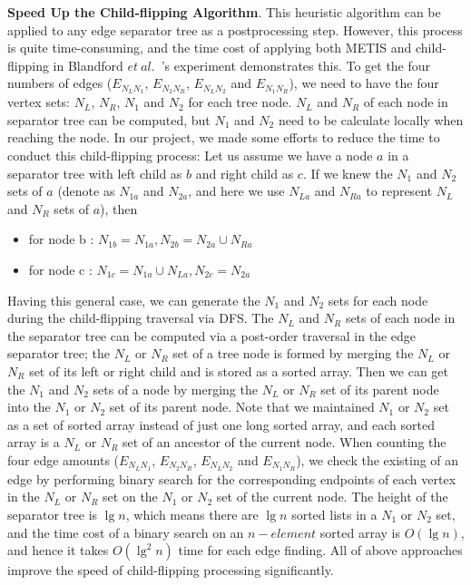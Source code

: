 \documentclass[12pt,glossary]{dalthesis}
\begin{document}
\bigskip
\bigskip

\textbf{Speed Up the Child-flipping Algorithm}. This heuristic algorithm can be applied to any edge separator tree as a postprocessing step. However, this process is quite time-consuming, and the time cost of applying both METIS and child-flipping in Blandford $et \ al.$~\cite{compact-representation}'s experiment demonstrates this. To get the four numbers of edges ($E_{N_{L}N_{1}}$, $E_{N_{2}N_{R}}$, $E_{N_{L}N_{2}}$ and $E_{N_{1}N_{R}}$), we need to have the four vertex sets: $N_{L}$, $N_{R}$, $N_{1}$ and $N_{2}$ for each tree node. $N_{L}$ and $N_{R}$ of each node in separator tree can be computed, but $N_{1}$ and $N_{2}$ need to be calculate locally when reaching the node. In our project, we made some efforts to reduce the time to conduct this child-flipping process: Let us assume we have a node $a$ in a separator tree with left child as $b$ and right child as $c$. If we knew the $N_{1}$ and $N_{2}$ sets of $a$ (denote as $N_{1a}$ and $N_{2a}$, and here we use $N_{La}$ and $N_{Ra}$ to represent $N_{L}$ and $N_{R}$ sets of $a$), then

\begin{itemize}[noitemsep]
\item for node b : $ N_{1b} = N_{1a}, N_{2b} = N_{2a} \cup N_{Ra}$
\item for node c : $ N_{1c} = N_{1a} \cup N_{La}, N_{2c} = N_{2a}$ 
\end{itemize}

Having this general case,  we can generate the $N_{1}$ and $N_{2}$ sets for each node during the child-flipping traversal via DFS. The $N_{L}$ and $N_{R}$ sets of each node in the separator tree can be computed via a post-order traversal in the edge separator tree; the $N_{L}$ or $N_{R}$ set of a tree node is formed by merging the $N_{L}$ or $N_{R}$ set of its left or right child and is stored as a sorted array. Then we can get the $N_{1}$ and $N_{2}$ sets of a node by merging the $N_{L}$ or $N_{R}$ set of its parent node into the $N_{1}$ or $N_{2}$ set of its parent node. Note that we maintained $N_{1}$ or $N_{2}$ set as a set of sorted array instead of just one long sorted array, and each sorted array is a $N_{L}$ or $N_{R}$ set of an ancestor of the current node. When counting the four edge amounts ($E_{N_{L}N_{1}}$, $E_{N_{2}N_{R}}$, $E_{N_{L}N_{2}}$ and $E_{N_{1}N_{R}}$), we check the existing of an edge by performing binary search for the corresponding endpoints of each vertex in the $N_{L}$ or $N_{R}$ set on the $N_{1}$ or $N_{2}$ set of the current node. The height of the separator tree is $\lg n$, which means there are $\lg n$ sorted lists in a $N_{1}$ or $N_{2}$ set, and the time cost of a binary search on an $n-element$ sorted array is $O(\lg n)$, and hence it takes $O(\lg ^{2} n)$ time for each edge finding. All of above approaches improve the speed of child-flipping processing significantly.
\end{document}
